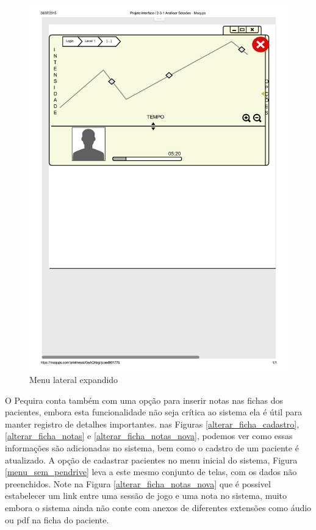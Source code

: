 \documentclass[12pt]{article}
\begin{document}
\begin{figure}[h!]
\centering
\includegraphics[scale=0.6]{imagens/2-3-1Analisar_Sessoes1.pdf}
\caption{Menu lateral expandido}
\label{emotiv1}
\end{figure}
\newpage

O Pequira conta também com uma opção para inserir notas nas fichas dos pacientes, embora esta funcionalidade não seja crítica ao sistema ela é útil para manter registro de detalhes importantes. nas Figuras \ref{alterar_ficha_cadastro}, \ref{alterar_ficha_notas} e \ref{alterar_ficha_notas_nova}, podemos ver como essas informações são adicionadas no sistema, bem como o cadstro de um paciente é atualizado.
A opção de cadastrar pacientes no menu inicial do sistema, Figura \ref{menu_sem_pendrive} leva a este mesmo conjunto de telas, com os dados não preenchidos. Note na Figura \ref{alterar_ficha_notas_nova} que é possivel estabelecer um link entre uma sessão de jogo e uma nota no sistema, muito embora o sistema ainda não conte com anexos de diferentes extensões como áudio ou pdf na ficha do paciente.
\end{document}
